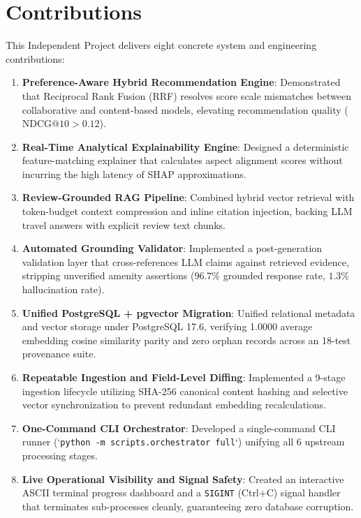 \section{Contributions}
This Independent Project delivers eight concrete system and engineering contributions:
\begin{enumerate}
    \item \textbf{Preference-Aware Hybrid Recommendation Engine}: Demonstrated that Reciprocal Rank Fusion (RRF) resolves score scale mismatches between collaborative and content-based models, elevating recommendation quality ($\text{NDCG}@10 > 0.12$).
    \item \textbf{Real-Time Analytical Explainability Engine}: Designed a deterministic feature-matching explainer that calculates aspect alignment scores without incurring the high latency of SHAP approximations.
    \item \textbf{Review-Grounded RAG Pipeline}: Combined hybrid vector retrieval with token-budget context compression and inline citation injection, backing LLM travel answers with explicit review text chunks.
    \item \textbf{Automated Grounding Validator}: Implemented a post-generation validation layer that cross-references LLM claims against retrieved evidence, stripping unverified amenity assertions ($96.7\%$ grounded response rate, $1.3\%$ hallucination rate).
    \item \textbf{Unified PostgreSQL + pgvector Migration}: Unified relational metadata and vector storage under PostgreSQL 17.6, verifying 1.0000 average embedding cosine similarity parity and zero orphan records across an 18-test provenance suite.
    \item \textbf{Repeatable Ingestion and Field-Level Diffing}: Implemented a 9-stage ingestion lifecycle utilizing SHA-256 canonical content hashing and selective vector synchronization to prevent redundant embedding recalculations.
    \item \textbf{One-Command CLI Orchestrator}: Developed a single-command CLI runner (`\texttt{python -m scripts.orchestrator full}`) unifying all 6 upstream processing stages.
    \item \textbf{Live Operational Visibility and Signal Safety}: Created an interactive ASCII terminal progress dashboard and a \texttt{SIGINT} (Ctrl+C) signal handler that terminates sub-processes cleanly, guaranteeing zero database corruption.
\end{enumerate}

